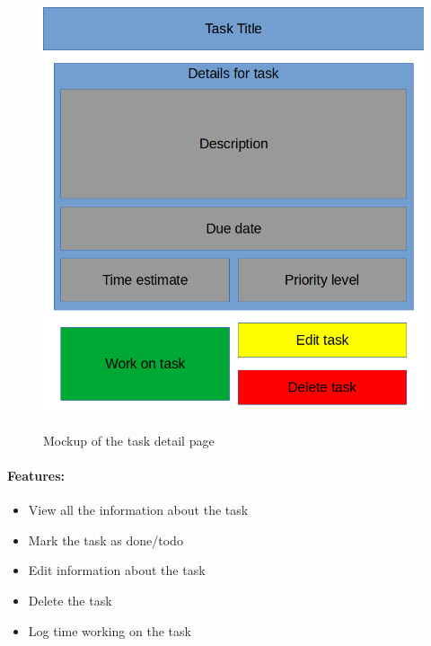 \documentclass{article}
\begin{document}
\begin{minipage}{0.5\textwidth}
	\begin{figure}[H]
		\includegraphics[width=\linewidth]{Mockups/task_detail.png}
		\label{fig:task_detail_mockup}
		\caption{Mockup of the task detail page}
	\end{figure}
\end{minipage} \hfill
\begin{minipage}{0.45\textwidth}
	\paragraph{Features:}
	\begin{itemize}
		\item View all the information about the task
		\item Mark the task as done/todo
		\item Edit information about the task
		\item Delete the task
		\item Log time working on the task
	\end{itemize}
\end{minipage}
\end{document}
